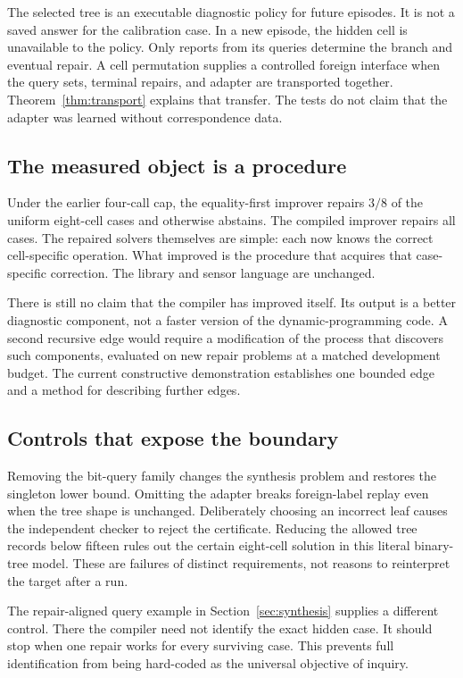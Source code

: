 \documentclass[11pt,letterpaper]{article}
\theoremstyle{plain}
\theoremstyle{definition}
\begin{document}
The selected tree is an executable diagnostic policy for future episodes. It is not a saved answer for the calibration case. In a new episode, the hidden cell is unavailable to the policy. Only reports from its queries determine the branch and eventual repair. A cell permutation supplies a controlled foreign interface when the query sets, terminal repairs, and adapter are transported together. Theorem~\ref{thm:transport} explains that transfer. The tests do not claim that the adapter was learned without correspondence data.

\subsection{The measured object is a procedure}
Under the earlier four-call cap, the equality-first improver repairs $3/8$ of the uniform eight-cell cases and otherwise abstains. The compiled improver repairs all cases. The repaired solvers themselves are simple: each now knows the correct cell-specific operation. What improved is the procedure that acquires that case-specific correction. The library and sensor language are unchanged.

There is still no claim that the compiler has improved itself. Its output is a better diagnostic component, not a faster version of the dynamic-programming code. A second recursive edge would require a modification of the process that discovers such components, evaluated on new repair problems at a matched development budget. The current constructive demonstration establishes one bounded edge and a method for describing further edges.

\subsection{Controls that expose the boundary}
Removing the bit-query family changes the synthesis problem and restores the singleton lower bound. Omitting the adapter breaks foreign-label replay even when the tree shape is unchanged. Deliberately choosing an incorrect leaf causes the independent checker to reject the certificate. Reducing the allowed tree records below fifteen rules out the certain eight-cell solution in this literal binary-tree model. These are failures of distinct requirements, not reasons to reinterpret the target after a run.

The repair-aligned query example in Section~\ref{sec:synthesis} supplies a different control. There the compiler need not identify the exact hidden case. It should stop when one repair works for every surviving case. This prevents full identification from being hard-coded as the universal objective of inquiry.
\end{document}
